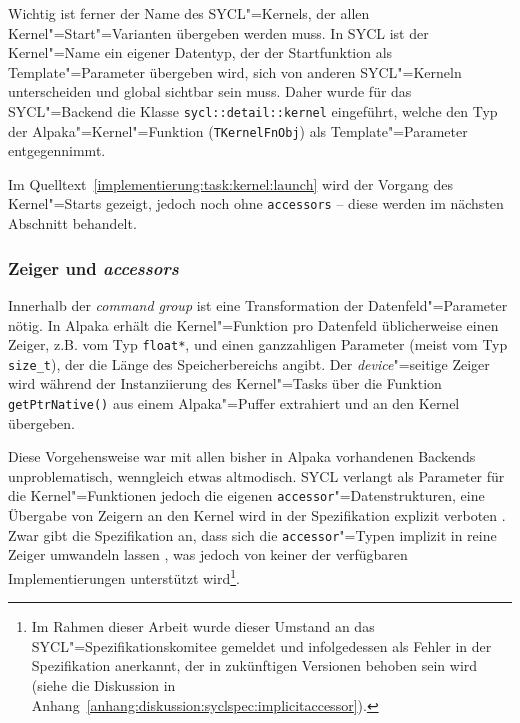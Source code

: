 Wichtig ist ferner der Name des SYCL"=Kernels, der allen
Kernel"=Start"=Varianten übergeben werden muss. In SYCL ist der Kernel"=Name ein
eigener Datentyp, der der Startfunktion als Template"=Parameter übergeben wird,
sich von anderen SYCL"=Kerneln unterscheiden und global sichtbar sein muss.
Daher wurde für das SYCL"=Backend die Klasse \texttt{sycl::detail::kernel}
eingeführt, welche den Typ der Alpaka"=Kernel"=Funktion (\texttt{TKernelFnObj})
als Template"=Parameter entgegennimmt.

Im Quelltext~\ref{implementierung:task:kernel:launch} wird der Vorgang des
Kernel"=Starts gezeigt, jedoch noch ohne \texttt{accessors} -- diese werden
im nächsten Abschnitt behandelt.

\subsubsection{Zeiger und \textit{accessors}}

Innerhalb der \textit{command group} ist eine Transformation der
Datenfeld"=Parameter nötig. In Alpaka erhält die Kernel"=Funktion pro Datenfeld
üblicherweise einen Zeiger, z.B. vom Typ \texttt{float*}, und einen ganzzahligen
Parameter (meist vom Typ \texttt{size\_t}), der die Länge des Speicherbereichs
angibt. Der \textit{device}"=seitige Zeiger wird während der Instanziierung des
Kernel"=Tasks über die Funktion \texttt{getPtrNative()} aus einem Alpaka"=Puffer
extrahiert und an den Kernel übergeben.

Diese Vorgehensweise war mit allen bisher in Alpaka vorhandenen Backends
unproblematisch, wenngleich etwas altmodisch. SYCL verlangt als Parameter für
die Kernel"=Funktionen jedoch die eigenen \texttt{accessor}"=Datenstrukturen,
eine Übergabe von Zeigern an den Kernel wird in der Spezifikation explizit
verboten \cite[vgl.][192]{sycl2019}. Zwar gibt die Spezifikation an, dass sich
die \texttt{accessor}"=Typen implizit in reine Zeiger umwandeln lassen
\cite[vgl.][27]{sycl2019}, was jedoch von keiner der verfügbaren
Implementierungen unterstützt wird\footnote{Im Rahmen dieser Arbeit wurde dieser
Umstand an das SYCL"=Spezifikationskomitee gemeldet und infolgedessen als Fehler
in der Spezifikation anerkannt, der in zukünftigen Versionen behoben sein wird
(siehe die Diskussion in
Anhang~\ref{anhang:diskussion:syclspec:implicitaccessor}).}.

